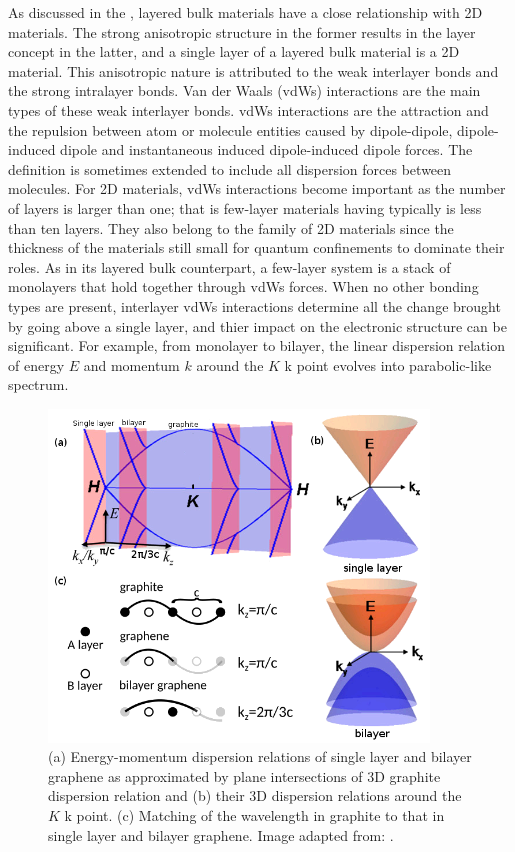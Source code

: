 As discussed in the , layered bulk materials have a close relationship with 2D materials. The strong anisotropic structure in the former results in the layer concept in the latter, and a single layer of a layered bulk material is a 2D material. This anisotropic nature is attributed to the weak interlayer bonds and the strong intralayer bonds. Van der Waals (vdWs) interactions \cite{vdws} are the main types of these weak interlayer bonds. vdWs interactions are the attraction and the repulsion between atom or molecule entities caused by dipole-dipole, dipole-induced dipole and instantaneous induced dipole-induced dipole forces. The definition is sometimes extended to include all dispersion forces between molecules.  For 2D materials, vdWs interactions become important as the number of layers is larger than one; that is few-layer materials having typically is less than ten layers. They also belong to the family of 2D materials since the thickness of the materials still small for quantum confinements to dominate their roles. As in its layered bulk counterpart, a few-layer system is a stack of monolayers that hold together through vdWs forces. When no other bonding types are present, interlayer vdWs interactions determine all the change brought by going above a single layer, and thier impact on the electronic structure can be significant. For example, from monolayer to bilayer, the linear dispersion relation of energy $E$ and momentum $k$ around the $K$ k point evolves into parabolic-like spectrum\cite{Partoens2006,Mak2010a}. 

\begin{figure}[htbp!] 
\centering  
\includegraphics[width=0.9\textwidth]{gra_band.png}
\caption{(a) Energy-momentum dispersion relations of single layer and bilayer graphene as approximated by plane intersections of 3D graphite dispersion relation and (b) their 3D dispersion relations around the $K$ k point. (c) Matching of the wavelength in graphite to that in single layer and bilayer graphene. Image adapted from: \cite{Mak2010a}. }  
\label{fig:gra_bands}
\end{figure} 

